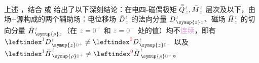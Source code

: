 上述 ，结合  或  给出了以下深刻结论：在\textcolor{NavyBlue}{电四-磁偶}极矩 $\bar{\bar{Q}}^{\;\!\mathcolor{gray}{t}}_{\;\!\mathcolor{gray}{z}}, \bar{M}^{\;\!\mathcolor{gray}{t}}_{\;\!\mathcolor{gray}{z}}$ 层次及以下，由场$+$源构成的两个\textcolor{NavyBlue}{辅助场}：电位移场 $\bar{D}^{\;\!\mathcolor{gray}{t}}_{\;\!\mathcolor{gray}{z}}$ 的法向分量 $D^{\;\!\mathcolor{gray}{t}}_{\;\! \symup{z} \mathcolor{gray}{z}}$、磁场 $\bar{H}^{\;\!\mathcolor{gray}{t}}_{\;\!\mathcolor{gray}{z}}$ 的切向分量 $\bar{H}^{\;\!\mathcolor{gray}{t}}_{\;\! \symup{\rho} \mathcolor{gray}{z}}$（在 $\mathcolor{gray}{z \mathcolor{black}{=} 0^+}$ 和 $\mathcolor{gray}{z \mathcolor{black}{=} 0^-}$ 处的值）均不\textcolor{Plum}{连续}，即有 $\leftindex^{\textcolor{Maroon}{1}} D^{\;\!\mathcolor{gray}{t}}_{\;\! \symup{z} \mathcolor{gray}{0^+}} \neq \leftindex^{\textcolor{Maroon}{0}} D^{\;\!\mathcolor{gray}{t}}_{\;\! \symup{z} \mathcolor{gray}{0^-}}$ 以及 $\leftindex^{\textcolor{Maroon}{1}} {\bar{H}}^{\;\!\mathcolor{gray}{t}}_{\;\! \symup{\rho} \mathcolor{gray}{0^+}} \neq \leftindex^{\textcolor{Maroon}{0}} {\bar{H}}^{\;\!\mathcolor{gray}{t}}_{\;\! \symup{\rho} \mathcolor{gray}{0^-}}$。


